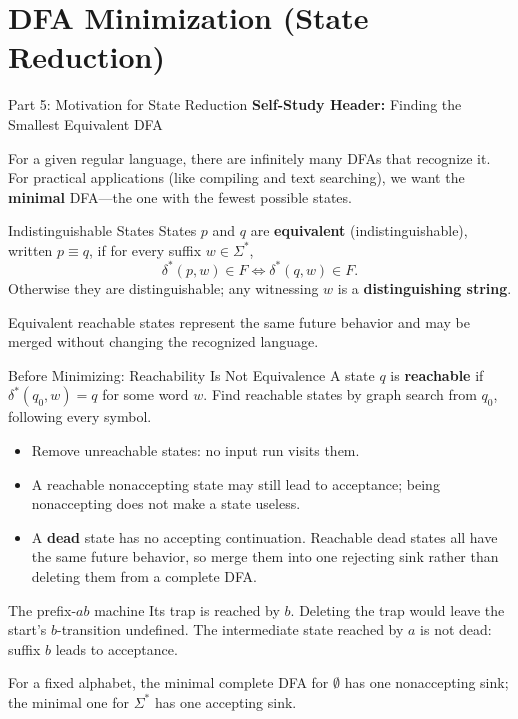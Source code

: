 \documentclass[10pt]{beamer}
\begin{document}
\section{DFA Minimization (State Reduction)}

\begin{frame}{Part 5: Motivation for State Reduction}
  \small
  \textbf{Self-Study Header:} Finding the Smallest Equivalent DFA
  \vspace{0.2cm}
  
  For a given regular language, there are infinitely many DFAs that recognize it. For practical applications (like compiling and text searching), we want the \textbf{minimal} DFA—the one with the fewest possible states.
  
  \pause
  \begin{block}{Indistinguishable States}
    States $p$ and $q$ are \textbf{equivalent} (indistinguishable), written
    $p\equiv q$, if for every suffix $w\in\Sigma^*$,
    \[
      \delta^*(p,w)\in F
      \iff
      \delta^*(q,w)\in F.
    \]
    Otherwise they are distinguishable; any witnessing $w$ is a
    \textbf{distinguishing string}.
  \end{block}
  \pause
  Equivalent reachable states represent the same future behavior and may be
  merged without changing the recognized language.
\end{frame}

\begin{frame}{Before Minimizing: Reachability Is Not Equivalence}
  \small
  A state $q$ is \textbf{reachable} if $\delta^*(q_0,w)=q$ for some word $w$.
  Find reachable states by graph search from $q_0$, following every symbol.
  \pause
  \begin{itemize}
    \item Remove unreachable states: no input run visits them.
    \item A reachable nonaccepting state may still lead to acceptance;
      being nonaccepting does not make a state useless.
    \item A \textbf{dead} state has no accepting continuation. Reachable
      dead states all have the same future behavior, so merge them into
      one rejecting sink rather than deleting them from a complete DFA.
  \end{itemize}
  \pause
  \begin{exampleblock}{The prefix-$ab$ machine}
    Its trap is reached by $b$. Deleting the trap would leave the start's
    $b$-transition undefined. The intermediate state reached by $a$ is not
    dead: suffix $b$ leads to acceptance.
  \end{exampleblock}
  For a fixed alphabet, the minimal complete DFA for $\emptyset$ has one
  nonaccepting sink; the minimal one for $\Sigma^*$ has one accepting sink.
\end{frame}
\end{document}

